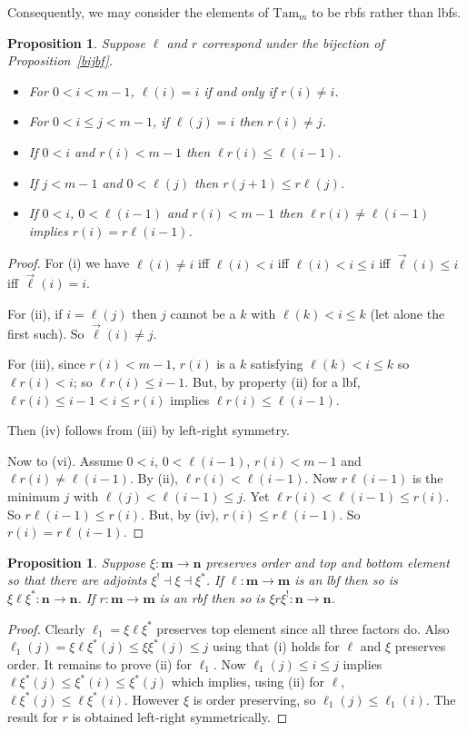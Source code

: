 \documentclass[a4paper,12pt,reqno]{amsart}
\newtheorem{proposition}[theorem]{Proposition}
\theoremstyle{definition}
\theoremstyle{fact}
\theoremstyle{genquest}
\theoremstyle{step}
\newcommand{\lra}{\longrightarrow}
\newcommand{\ora}{\overrightarrow}
\def\ordm{{\mathbf{m}}}
\def\ordn{{\mathbf{n}}}
\begin{document}
Consequently, we may consider the elements of 
$\mathrm{Tam}_m$ to be rbfs rather than lbfs.

\begin{proposition}\label{fixbf}
Suppose $\ell$ and $r$ correspond under the bijection of Proposition~\ref{bijbf}.
\begin{itemize}
\item[(i)] For $0<i<m-1$, $\ell(i)=i$ if and only if $r(i) \neq i$.
\item[(ii)] For $0<i\le j <m-1$, if $\ell (j) = i$ then $r(i) \neq j$.
\item[(iii)] If $0<i$ and $r(i)<m-1$ then $\ell r(i) \le \ell(i-1)$.
\item[(iv)] If $j<m-1$ and $0<\ell(j)$ then $r(j+1) \le r\ell(j)$. 
\item[(v)] If $0<i$, $0<\ell(i-1)$ and $r(i)<m-1$ then $\ell r(i) \neq \ell(i-1)$
implies $r(i) = r\ell(i-1)$.  
\end{itemize}
\end{proposition}
\begin{proof}
For (i) we have $\ell(i)\neq i$ iff $\ell(i)<i$ iff $\ell(i)<i\le i$ iff $\ora{\ell}(i)\le i$
iff $\ora{\ell}(i) = i$.   

For (ii), if $i=\ell(j)$ then $j$ cannot be a $k$ with $\ell(k)<i \le k$ (let alone the first such).
So $\ora{\ell}(i) \neq j$. 

For (iii), since $r(i)<m-1$, $r(i)$ is a $k$ satisfying $\ell(k) < i\le k$ so $\ell r(i)<i$;
so $\ell r(i)\le i-1$. But, by property (ii) for a lbf, 
$\ell r(i)\le i-1< i \le r(i)$ implies $\ell r(i)\le \ell (i-1)$. 

Then (iv) follows from (iii) by left-right symmetry. 

Now to (vi). Assume $0<i$, $0<\ell(i-1)$, $r(i)<m-1$ and $\ell r(i) \neq \ell(i-1)$.
By (ii), $\ell r(i) < \ell(i-1)$. Now $r\ell(i-1)$ is the minimum $j$ with 
$\ell(j)<\ell(i-1)\le j$. Yet $\ell r(i) < \ell(i-1) \le r(i)$. So $r\ell(i-1)\le r(i)$.
But, by (iv), $r(i)\le r\ell(i-1)$. So $r(i)= r\ell(i-1)$. 
\end{proof}

\begin{proposition}\label{lbf}
Suppose $\xi : \ordm \lra \ordn$ preserves order and top and bottom element
so that there are adjoints $\xi^! \dashv \xi \dashv \xi^*$. 
If $\ell:\ordm \lra \ordm$ is an lbf then so is $\xi \ell \xi^*:\ordn \lra \ordn$. 
If $r:\ordm \lra \ordm$ is an rbf then so is $\xi r \xi^!:\ordn \lra \ordn$.
\end{proposition}
\begin{proof} 
Clearly $\ell_1=\xi \ell \xi^*$ preserves top element since all three factors do. Also $\ell_1(j) = \xi \ell \xi^*(j) \le \xi \xi^* (j) \le j$ using that (i) holds for $\ell$ and $\xi$ preserves order. 
It remains to prove (ii) for $\ell_1$.
Now $\ell_1(j) \le i \le j$ implies $\ell\xi^*(j) \le \xi^*(i) \le \xi^*(j)$ which implies, using (ii) for $\ell$, $\ell\xi^*(j) \le \ell\xi^*(i)$. 
However $\xi$ is order preserving, so $\ell_1(j)\le \ell_1(i)$.
The result for $r$ is obtained left-right symmetrically.
\end{proof}
\end{document}
